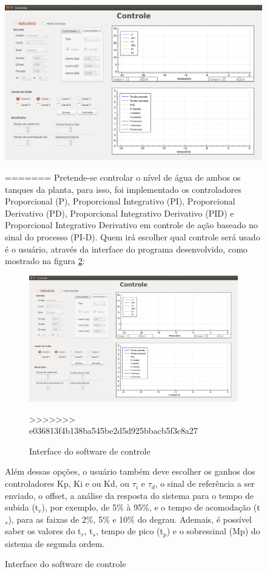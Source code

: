 \documentclass[a4paper,12pt]{article}
\begin{document}
\begin{flushleft}
\begin{figure}[H]
\centering
\includegraphics[width=13cm]{ImagensLab4/interface-versao4.png}
\caption{Interface gráfica}
\label{interface4}
=======
\hspace{4ex}Pretende-se controlar o nível de água de ambos os tanques da planta, para isso, foi implementado os controladores Proporcional (P), Proporcional Integrativo (PI), Proporcional Derivativo (PD), Proporcional Integrativo Derivativo (PID) e Proporcional Integrativo Derivativo em controle de ação baseado no sinal do processo (PI-D). Quem irá escolher qual controle será usado é o usuário, através da interface do programa desenvolvido, como mostrado na figura \ref{interface}:

\begin{figure}[H]
\centering
\includegraphics[width=11cm]{ImagensLab4/interface-versao4.png}
\caption{Interface do software de controle}
\label{interface}
>>>>>>> e036813f4b138ba545be2d5d925bbacb5f3c8a27
\end{figure}

\hspace{4ex}Além dessas opções, o usuário também deve escolher os ganhos dos controladores Kp, Ki e ou Kd, ou $\tau_i$ e $\tau_d$, o  sinal de referência a ser enviado, o offset, a análise da resposta do sistema para o tempo de subida (t$_r$), por exemplo, de 5\% à 95\%, e o tempo de acomodação (t$_s$), para as faixas de 2\%, 5\% e 10\% do degrau. Ademais, é possível saber os valores do  t$_r$, t$_s$, tempo de pico (t$_p$) e o sobressinal (Mp) do sistema de segunda ordem.


\end{figure}
\end{flushleft}
\end{document}
